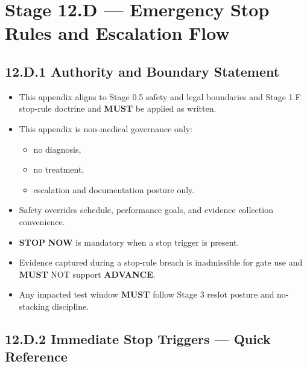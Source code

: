 \documentclass[10pt]{article}
\begin{document}
\section*{Stage 12.D — Emergency Stop Rules and Escalation Flow}
{}

\subsection*{12.D.1 Authority and Boundary Statement}
{}

\begin{itemize}
\item This appendix aligns to Stage 0.5 safety and legal boundaries and Stage 1.F stop-rule doctrine and \textbf{MUST} be applied as written.
\item This appendix is non-medical governance only:
  \begin{itemize}
  \item no diagnosis,
  \item no treatment,
  \item escalation and documentation posture only.
  \end{itemize}
\item Safety overrides schedule, performance goals, and evidence collection convenience.
\item \textbf{STOP} \textbf{NOW} is mandatory when a stop trigger is present.
\item Evidence captured during a stop-rule breach is inadmissible for gate use and \textbf{MUST} NOT support \textbf{ADVANCE}.
\item Any impacted test window \textbf{MUST} follow Stage 3 reslot posture and no-stacking discipline.
\end{itemize}

\subsection*{12.D.2 Immediate Stop Triggers — Quick Reference}
{}

\begingroup
\scriptsize
\setlength{\tabcolsep}{2pt}
\renewcommand{\arraystretch}{1.12}
\end{document}
